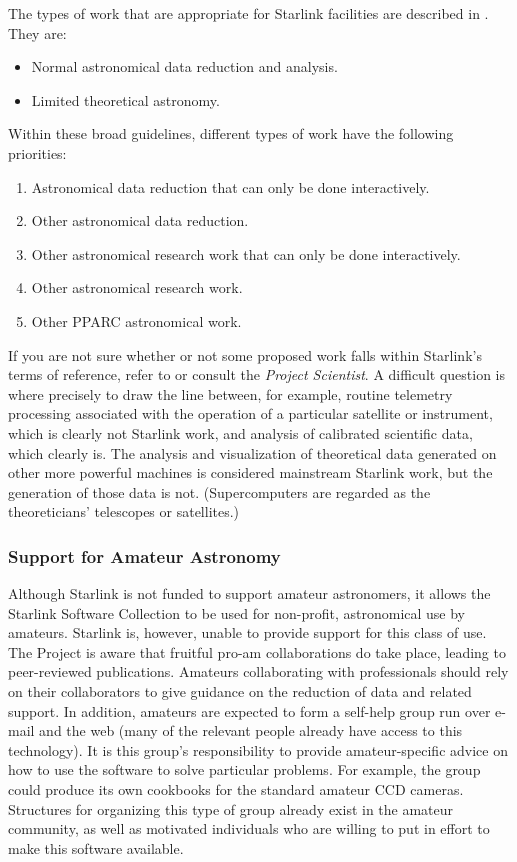 The types of work that are appropriate for Starlink facilities are described
in .
They are:

\begin{itemize}
\item Normal astronomical data reduction and analysis.
\item Limited theoretical astronomy.
\end{itemize}

Within these broad guidelines, different types of work have the following
priorities:

\begin{enumerate} 
\item Astronomical data reduction that can only be done interactively.  
\item Other astronomical data reduction.  
\item Other astronomical research work that can only be done interactively.
\item Other astronomical research work.  
\item Other PPARC astronomical work.
\end{enumerate} 

If you are not sure whether or not some proposed work falls within Starlink's
terms of reference, refer to
or consult the {\em Project Scientist}.
A difficult question is where precisely to draw the line between, for
example, routine telemetry processing associated with the operation of
a particular satellite or instrument, which is clearly not Starlink
work, and analysis of calibrated scientific data, which clearly is.
The analysis and visualization of theoretical data generated on other more
powerful machines is considered mainstream Starlink work, but the generation of
those data is not.
(Supercomputers are regarded as the theoreticians' telescopes or satellites.)

\subsubsection{\label{amateurs}Support for Amateur Astronomy}

Although Starlink is not funded to support amateur astronomers, it allows the
Starlink Software Collection to be used for non-profit, astronomical use by
amateurs.
Starlink is, however, unable to provide support for this class of use.
The Project is aware that fruitful pro-am collaborations do take place,
leading to peer-reviewed publications.
Amateurs collaborating with professionals should rely on their collaborators
to give guidance on the reduction of data and related support.
In addition, amateurs are expected to form a self-help group run over e-mail
and the web (many of the relevant people already have access to this
technology).
It is this group's responsibility to provide amateur-specific advice on how to
use the software to solve particular problems.
For example, the group could produce its own cookbooks for the standard amateur
CCD cameras.
Structures for organizing this type of group already exist in the amateur
community, as well as motivated individuals who are willing to put in effort to
make this software available.

